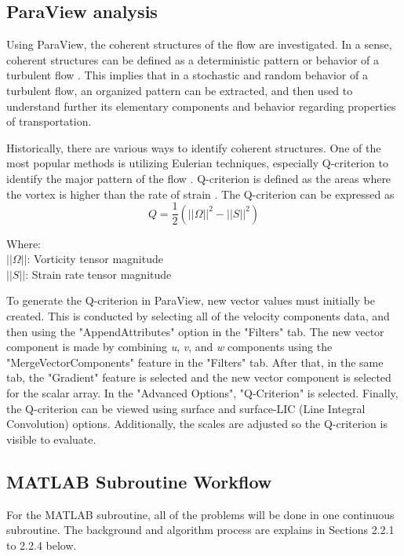 \documentclass[11pt]{article}
\begin{document}
\subsection{ParaView analysis}
\label{sc: Paraview}
Using ParaView, the coherent structures of the flow are investigated. In a sense, coherent structures can be defined as a deterministic pattern or behavior of a turbulent flow \citep{Hussain1983}. This implies that in a stochastic and random behavior of a turbulent flow, an organized pattern can be extracted, and then used to understand further its elementary components and behavior regarding properties of transportation. \par
\medskip
\noindent Historically, there are various ways to identify coherent structures. One of the most popular methods is utilizing Eulerian techniques, especially Q-criterion to identify the major pattern of the flow \citep{ScK2017}. Q-criterion is defined as the areas where the vortex is higher than the rate of strain \citep{Szwabowski2021}. The Q-criterion can be expressed as 
\begin{equation}
    Q = \frac12 (||\Omega||^2 - ||S||^2)
\end{equation}
\begin{tabbing}
Where: \= \\
$||\Omega||$: \> Vorticity tensor magnitude\\
$||S||$:\> Strain rate tensor magnitude
\end{tabbing}
\noindent To generate the Q-criterion in ParaView, new vector values must initially be created. This is conducted by selecting all of the velocity components data, and then using the "AppendAttributes" option in the "Filters" tab. The new vector component is made by combining \textit{u}, \textit{v}, and \textit{w} components using the "MergeVectorComponents" feature in the "Filters" tab. After that, in the same tab, the "Gradient" feature is selected and the new vector component is selected for the scalar array. In the "Advanced Options", "Q-Criterion" is selected. Finally, the Q-criterion can be viewed using surface and surface-LIC (Line Integral Convolution) options. Additionally, the scales are adjusted so the Q-criterion is visible to evaluate.
\subsection{MATLAB Subroutine Workflow}
\label{sc: Matlab}
For the MATLAB subroutine, all of the problems will be done in one continuous subroutine. The background and algorithm process are explains in Sections 2.2.1 to 2.2.4 below.
\end{document}
